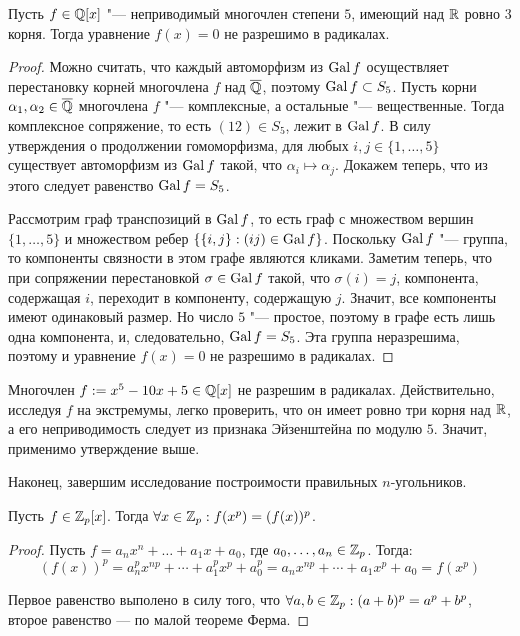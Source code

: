 \begin{corollary}
	Пусть $f \in \mathbb{Q}[x]$ "--- неприводимый многочлен степени $5$, имеющий над $\mathbb{R}$ ровно $3$ корня. Тогда уравнение $f(x) = 0$ не разрешимо в радикалах.
\end{corollary}

\begin{proof}
	Можно считать, что каждый автоморфизм из $\operatorname{Gal}{f}$ осуществляет перестановку корней многочлена $f$ над $\overline{\mathbb{Q}}$, поэтому $\operatorname{Gal}{f} \subset S_5$. Пусть корни $\alpha_1, \alpha_2 \in \overline{\mathbb{Q}}$ многочлена $f$ "--- комплексные, а остальные "--- вещественные. Тогда комплексное сопряжение, то есть $(12) \in S_5$, лежит в $\operatorname{Gal}{f}$. В силу утверждения о продолжении гомоморфизма, для любых $i, j \in \{1, \dotsc, 5\}$ существует автоморфизм из $\operatorname{Gal}{f}$ такой, что $\alpha_i \mapsto \alpha_j$. Докажем теперь, что из этого следует равенство $\operatorname{Gal}{f} = S_5$.
	
	Рассмотрим граф транспозиций в $\operatorname{Gal}{f}$, то есть граф с множеством вершин $\{1, \dotsc, 5\}$ и множеством ребер $\{\{i, j\} : (ij) \in \operatorname{Gal}{f}\}$. Поскольку $\operatorname{Gal}{f}$ "--- группа, то компоненты связности в этом графе являются кликами. Заметим теперь, что при сопряжении перестановкой $\sigma \in \operatorname{Gal}{f}$ такой, что $\sigma(i) = j$, компонента, содержащая $i$, переходит в компоненту, содержащую $j$. Значит, все компоненты имеют одинаковый размер. Но число $5$ "--- простое, поэтому в графе есть лишь одна компонента, и, следовательно, $\operatorname{Gal}{f} = S_5$. Эта группа неразрешима, поэтому и уравнение $f(x) = 0$ не разрешимо в радикалах.
\end{proof}

\begin{example}
	Многочлен $f := x^5 - 10x + 5 \in \mathbb{Q}[x]$ не разрешим в радикалах. Действительно, исследуя $f$ на экстремумы, легко проверить, что он имеет ровно три корня над $\mathbb{R}$, а его неприводимость следует из признака Эйзенштейна по модулю $5$. Значит, применимо утверждение выше.
\end{example}

Наконец, завершим исследование построимости правильных $n$-угольников.

\begin{proposition}
	Пусть $f \in \mathbb{Z}_p[x]$. Тогда $\forall x \in \mathbb{Z}_p: f(x^p) = (f(x))^p$.
\end{proposition}

\begin{proof}
	Пусть $f = a_nx^n + \dotsc + a_1x + a_0$, где $a_0, \dotsc, a_n \in \mathbb{Z}_p$. Тогда:
	\[(f(x))^p = a_n^px^{np} + \dotsb + a_1^px^p + a_0^p = a_nx^{np} + \dotsb + a_1x^p + a_0 = f(x^p)\]
	
	Первое равенство выполено в силу того, что $\forall a, b \in \mathbb{Z}_p: (a + b)^p = a^p + b^p$, второе равенство --- по малой теореме Ферма.
\end{proof}

